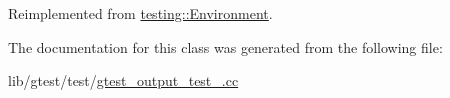 Reimplemented from \hyperlink{classtesting_1_1_environment_a039bdaa705c46b9b88234cf4d3bb6254}{testing\-::\-Environment}.



The documentation for this class was generated from the following file\-:\begin{DoxyCompactItemize}
\item 
lib/gtest/test/\hyperlink{gtest__output__test___8cc}{gtest\-\_\-output\-\_\-test\-\_\-.\-cc}\end{DoxyCompactItemize}
